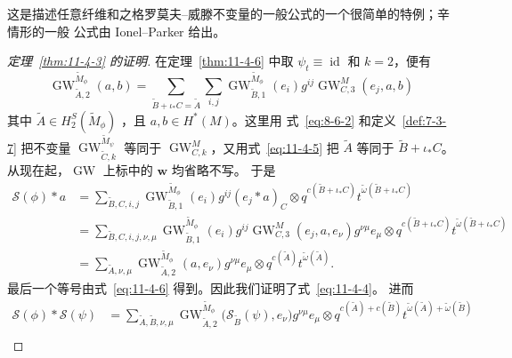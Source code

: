 这是描述任意纤维和之格罗莫夫--威滕不变量的一般公式的一个很简单的特例；辛情形的一般
公式由 Ionel--Parker  给出。

\begin{proof}[定理~\ref{thm:11-4-3} 的证明]
在定理~\ref{thm:11-4-6} 中取 $\psi_t\equiv\operatorname{id}$ 和 $k=2$，便有
\begin{equation}\label{eq:11-4-6}
  \operatorname{GW}^{\widetilde M_\phi}_{\widetilde A,2}(a,b)
  =\sum_{\widetilde B+\iota_*C=\widetilde A}
   \sum_{i,j}
   \operatorname{GW}^{\widetilde M_\phi}_{\widetilde B,1}(e_i)
   g^{ij}\operatorname{GW}^M_{C,3}(e_j,a,b)
\end{equation}
其中 $\widetilde A\in H_2^S(\widetilde M_\phi)$
，且 $a,b\in H^*(M)$。这里用
式~\eqref{eq:8-6-2} 和定义~\ref{def:7-3-7} 把不变量
$\operatorname{GW}^{\widetilde M_\psi}_{\widetilde C,k}$ 等同于
$\operatorname{GW}^M_{C,k}$，又用式~\eqref{eq:11-4-5} 把 $\widetilde A$ 等同于
$\widetilde B+\iota_*C$。从现在起，$\operatorname{GW}$ 上标中的 $\mathbf w$ 均省略不写。
于是
\[
\begin{aligned}
  \mathcal S(\phi)*a
  &={}
  \sum_{\widetilde B,C,i,j}
  \operatorname{GW}^{\widetilde M_\phi}_{\widetilde B,1}(e_i)g^{ij}
  (e_j*a)_C\otimes
  q^{c(\widetilde B+\iota_*C)}
  t^{\widetilde\omega(\widetilde B+\iota_*C)}\\
  &={}
  \sum_{\widetilde B,C,i,j,\nu,\mu}
  \operatorname{GW}^{\widetilde M_\phi}_{\widetilde B,1}(e_i)g^{ij}
  \operatorname{GW}^M_{C,3}(e_j,a,e_\nu)g^{\nu\mu}e_\mu\otimes
  q^{c(\widetilde B+\iota_*C)}
  t^{\widetilde\omega(\widetilde B+\iota_*C)}\\
  &={}
  \sum_{\widetilde A,\nu,\mu}
  \operatorname{GW}^{\widetilde M_\phi}_{\widetilde A,2}(a,e_\nu)
  g^{\nu\mu}e_\mu\otimes
  q^{c(\widetilde A)}t^{\widetilde\omega(\widetilde A)}.
\end{aligned}
\]
最后一个等号由式~\eqref{eq:11-4-6} 得到。因此我们证明了式~\eqref{eq:11-4-4}。
进而
\[
\begin{aligned}
  \mathcal S(\phi)*\mathcal S(\psi)
  &={}
  \sum_{\widetilde A,\widetilde B,\nu,\mu}
  \operatorname{GW}^{\widetilde M_\phi}_{\widetilde A,2}
  \bigl(\mathcal S_{\widetilde B}(\psi),e_\nu\bigr)
  g^{\nu\mu}e_\mu\otimes
  q^{c(\widetilde A)+c(\widetilde B)}
  t^{\widetilde\omega(\widetilde A)+\widetilde\omega(\widetilde B)}\\

\end{aligned}\]
\end{proof}

